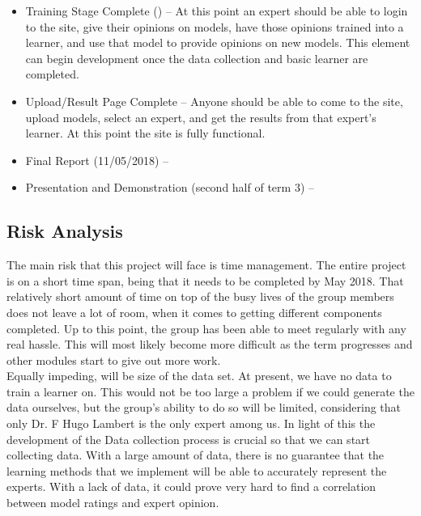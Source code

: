 \documentclass{ecmm427_assignment}
\begin{document}
\begin{itemize}
\item Training Stage Complete () – At this point an expert should be able to login to the site, give their opinions on models, have those opinions trained into a learner, and use that model to provide opinions on new models. This element can begin development once the data collection and basic learner are completed.

\item Upload/Result Page Complete – Anyone should be able to come to the site, upload models, select an expert, and get the results from that expert’s learner. At this point the site is fully functional.

\item Final Report (11/05/2018) –

\item Presentation and Demonstration (second half of term 3) –

\end{itemize}

\subsection{Risk Analysis}

\quad The main risk that this project will face is time management. The entire project is on a short time span, being that it needs to be completed by May 2018. That relatively short amount of time on top of the busy lives of the group members does not leave a lot of room, when it comes to getting different components completed. Up to this point, the group has been able to meet regularly with any real hassle. This will most likely become more difficult as the term progresses and other modules start to give out more work. \\

\quad Equally impeding, will be size of the data set. At present, we have no data to train a learner on. This would not be too large a problem if we could generate the data ourselves, but the group’s ability to do so will be limited, considering that only Dr. F Hugo Lambert is the only expert among us. In light of this the development of the Data collection process is crucial so that we can start collecting data. With a large amount of data, there is no guarantee that the learning methods that we implement will be able to accurately represent the experts. With a lack of data, it could prove very hard to find a correlation between model ratings and expert opinion.\\
\end{document}
